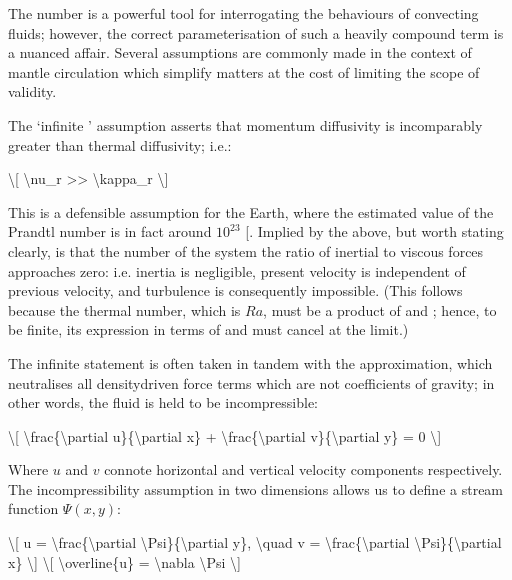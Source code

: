 \documentclass[letterpaper,10pt,english]{jupyterBook}
\begin{document}
\sphinxAtStartPar
The  number is a powerful tool for interrogating the behaviours of convecting fluids; however, the correct parameterisation of such a heavily compound term is a nuanced affair. Several assumptions are commonly made in the context of mantle circulation which simplify matters at the cost of limiting the scope of validity.

\sphinxAtStartPar
The ‘infinite ’ assumption asserts that momentum diffusivity is incomparably greater than thermal diffusivity; i.e.:

\sphinxAtStartPar
\textbackslash{}{[} \textbackslash{}nu\_r >> \textbackslash{}kappa\_r \textbackslash{}{]}

\sphinxAtStartPar
This is a defensible assumption for the Earth, where the estimated value of the Prandtl number is in fact around \(10^{23}\) {[}\sphinxcite{references:id89}{]}. Implied by the above, but worth stating clearly, is that the  number of the system \sphinxhyphen{} the ratio of inertial to viscous forces \sphinxhyphen{} approaches zero: i.e. inertia is negligible, present velocity is independent of previous velocity, and turbulence is consequently impossible. (This follows because the thermal  number, which is \(Ra\), must be a product of  and ; hence, to be finite, its expression in terms of  and  must cancel at the limit.)

\sphinxAtStartPar
The infinite  statement is often taken in tandem with the  approximation, which neutralises all density\sphinxhyphen{}driven force terms which are not coefficients of gravity; in other words, the fluid is held to be incompressible:

\sphinxAtStartPar
\textbackslash{}{[} \textbackslash{}frac\{\textbackslash{}partial u\}\{\textbackslash{}partial x\} + \textbackslash{}frac\{\textbackslash{}partial v\}\{\textbackslash{}partial y\} = 0 \textbackslash{}{]}

\sphinxAtStartPar
Where \(u\) and \(v\) connote horizontal and vertical velocity components respectively. The incompressibility assumption in two dimensions allows us to define a stream function \(\Psi(x, y)\):

\sphinxAtStartPar
\textbackslash{}{[} u = \textbackslash{}frac\{\textbackslash{}partial \textbackslash{}Psi\}\{\textbackslash{}partial y\}, \textbackslash{}quad v = \sphinxhyphen{}\textbackslash{}frac\{\textbackslash{}partial \textbackslash{}Psi\}\{\textbackslash{}partial x\} \textbackslash{}{]}
\textbackslash{}{[} \textbackslash{}overline\{u\} = \textbackslash{}nabla \textbackslash{}Psi \textbackslash{}{]}
\end{document}
